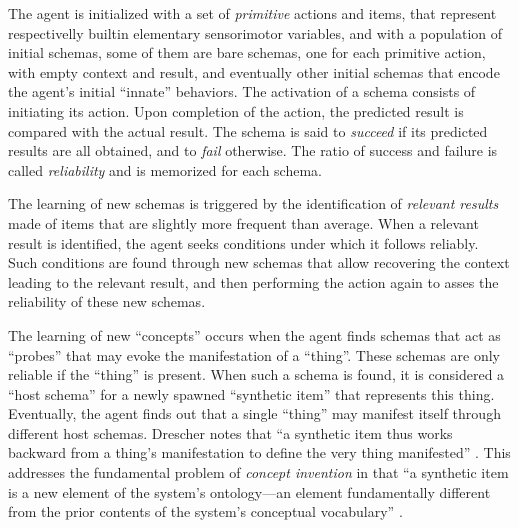 \documentclass[runningheads]{llncs}
\begin{document}
The agent is initialized with a set of \textit{primitive} actions and items, that represent respectivelly builtin elementary sensorimotor variables, and with a population of initial schemas, some of them are bare schemas, one for each primitive action, with empty context and result, and eventually other initial schemas that encode the agent's initial ``innate'' behaviors. 
The activation of a schema consists of initiating its action. 
Upon completion of the action, the predicted result is compared with the actual result.
The schema is said to \textit{succeed} if its predicted results are all obtained, and to \textit{fail} otherwise. 
The ratio of success and failure is called \textit{reliability} and is memorized for each schema.  

The learning of new schemas is triggered by the identification of \textit{relevant results} made of items that are slightly more frequent than average. 
When a relevant result is identified, the agent seeks conditions under which it follows reliably. 
Such conditions are found through new schemas that allow recovering the context leading to the relevant result, and then performing the action again to asses the reliability of these new schemas. 

The learning of new ``concepts'' occurs when the agent finds schemas that act as ``probes'' that may evoke the manifestation of a ``thing''. 
These schemas are only reliable if the ``thing'' is present. 
When such a schema is found, it is considered a ``host schema'' for a newly spawned ``synthetic item'' that represents this thing.
Eventually, the agent finds out that a single ``thing'' may manifest itself through different host schemas. 
Drescher notes that ``a synthetic item thus works backward from a thing's manifestation to define the very thing manifested'' \cite[p. 83]{drescher_made-up_1991}.
This addresses the fundamental problem of \textit{concept invention} in that 
``a synthetic item is a new element of the system's ontology---an element fundamentally different from the prior contents of the system's conceptual vocabulary'' \cite[p. 81]{drescher_made-up_1991}.
\end{document}
